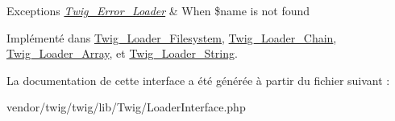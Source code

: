 \begin{DoxyExceptions}{Exceptions}
{\em \hyperlink{class_twig___error___loader}{Twig\+\_\+\+Error\+\_\+\+Loader}} & When \$name is not found \\
\hline
\end{DoxyExceptions}


Implémenté dans \hyperlink{class_twig___loader___filesystem_a3ee0419b212dc4f6f1e8a5a615423ad8}{Twig\+\_\+\+Loader\+\_\+\+Filesystem}, \hyperlink{class_twig___loader___chain_a3ee0419b212dc4f6f1e8a5a615423ad8}{Twig\+\_\+\+Loader\+\_\+\+Chain}, \hyperlink{class_twig___loader___array_a3ee0419b212dc4f6f1e8a5a615423ad8}{Twig\+\_\+\+Loader\+\_\+\+Array}, et \hyperlink{class_twig___loader___string_a3ee0419b212dc4f6f1e8a5a615423ad8}{Twig\+\_\+\+Loader\+\_\+\+String}.



La documentation de cette interface a été générée à partir du fichier suivant \+:\begin{DoxyCompactItemize}
\item 
vendor/twig/twig/lib/\+Twig/Loader\+Interface.\+php\end{DoxyCompactItemize}
